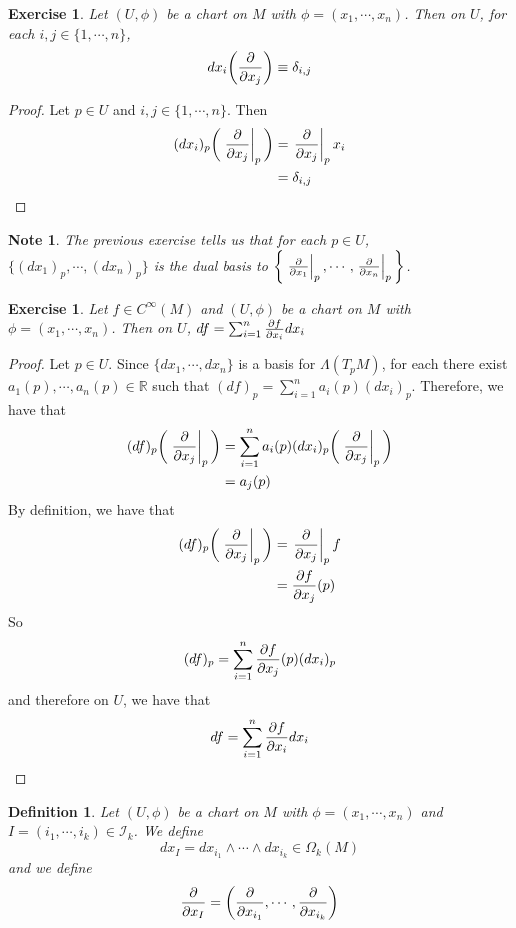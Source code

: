\documentclass[12pt]{amsart}
\newtheorem{defn}[thm]{Definition}
\newtheorem{note}[thm]{Note}
\newtheorem{ex}[thm]{Exercise}
\newcommand{\del}{\delta}
\newcommand{\Lam}{\Lambda}
\newcommand{\Om}{\Omega}
\newcommand{\R}{\mathbb{R}}
\newcommand{\MI}{\mathcal{I}}
\begin{document}
	\begin{ex}
		Let $(U, \phi)$ be a chart on $M$ with $\phi = (x_1, \cdots, x_n)$. Then on $U$, for each $i,j \in \{1, \cdots, n\}$, $$dx_i\bigg(\pdv{x_j} \bigg) \equiv \del_{i,j}$$
	\end{ex}

	\begin{proof}
		Let $p \in U$ and $i,j \in \{1, \cdots, n\}$. Then 
		\begin{align*}
			(dx_i)_p \bigg (\eval{\pdv{x_j}}_{p} \bigg ) 
			&= \eval{\pdv{x_j}}_{p} x_i \\
			&= \del_{i,j} \\
		\end{align*}
	\end{proof}

	\begin{note}
		The previous exercise tells us that for each $p \in U$, $\{(dx_1)_p, \cdots, (dx_n)_p \}$ is the dual basis to $\bigg \{ \eval{\pdv{x_1}}_{p}, \cdots, \eval{\pdv{x_n}}_{p} \bigg \}$.
	\end{note}

	\begin{ex}
		Let $f \in C^{\infty}(M)$ and $(U, \phi)$ be a chart on $M$ with $\phi = (x_1, \cdots, x_n)$. Then on $U$, $df = \sum_{i=1}^n \pdv{f}{x_i} dx_i$
	\end{ex}

	\begin{proof}
		Let $p \in U$. Since $\{dx_1, \cdots, dx_n\}$ is a basis for $\Lam(T_pM)$, for each there exist $a_1(p), \cdots, a_n(p) \in \R$ such that $(df)_p = \sum\limits_{i=1}^n a_i(p)(dx_i)_p$. Therefore, we have that 
		\begin{align*}
			(df)_p \bigg(\eval{\pdv{x_j}}_{p} \bigg) 
			&= \sum\limits_{i=1}^n a_i(p)(dx_i)_p \bigg(\eval{\pdv{x_j}}_{p} \bigg)  \\
			&=  a_j(p)
		\end{align*}
		By definition, we have that 
		\begin{align*}
			(df)_p\bigg(\eval{\pdv{x_j}}_{p} \bigg) 
			&= \eval{\pdv{x_j}}_{p} f \\ 
			&= {\pdv{f}{x_j}}(p)\\
		\end{align*}
		So $$(df)_p = \sum\limits_{i=1}^n {\pdv{f}{x_j}}(p)(dx_i)_p$$ and therefore on $U$, we have that $$df = \sum\limits_{i=1}^n {\pdv{f}{x_i}}dx_i$$
	\end{proof}

	\begin{defn}
		Let $(U, \phi)$ be a chart on $M$ with $\phi = (x_1, \cdots, x_n)$ and $I = (i_1, \cdots, i_k) \in \MI_k$. We define $$dx_I = dx_{i_1} \wedge \cdots \wedge dx_{i_k} \in \Om_k(M)$$ 
		and we define $$\pdv{x_I}= \bigg(\pdv{x_{i_1}}, \cdots, \pdv{x_{i_k}} \bigg)$$

	\end{defn}
\end{document}
